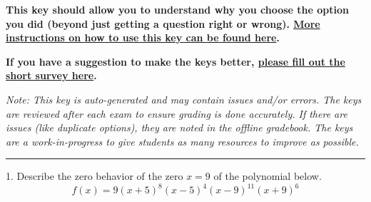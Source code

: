 \documentclass{extbook}[14pt]
\begin{document}
\textbf{This key should allow you to understand why you choose the option you did (beyond just getting a question right or wrong). \href{https://xronos.clas.ufl.edu/mac1105spring2020/courseDescriptionAndMisc/Exams/LearningFromResults}{More instructions on how to use this key can be found here}.}

\textbf{If you have a suggestion to make the keys better, \href{https://forms.gle/CZkbZmPbC9XALEE88}{please fill out the short survey here}.}

\textit{Note: This key is auto-generated and may contain issues and/or errors. The keys are reviewed after each exam to ensure grading is done accurately. If there are issues (like duplicate options), they are noted in the offline gradebook. The keys are a work-in-progress to give students as many resources to improve as possible.}

\rule{\textwidth}{0.4pt}

1. Describe the zero behavior of the zero $x = 9$ of the polynomial below.
\[ f(x) = 9(x + 5)^{8}(x - 5)^{4}(x - 9)^{11}(x + 9)^{6} \] 
\end{document}
